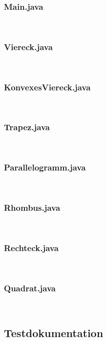\subsubsection{Main.java}\

\subsubsection{Viereck.java}\

\subsubsection{KonvexesViereck.java}\

\subsubsection{Trapez.java}\

\subsubsection{Parallelogramm.java}\

\subsubsection{Rhombus.java}\

\subsubsection{Rechteck.java}\

\subsubsection{Quadrat.java}\


\subsection{Testdokumentation}


